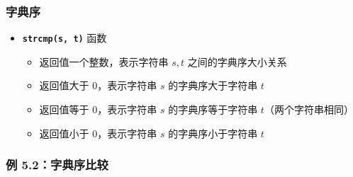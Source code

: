 \begin{frame}[fragile]
    \frametitle{字典序}

    \begin{itemize}
        \item<1-> \textbf{\lstinline|strcmp(s, t)|} 函数
        \begin{itemize}
            \item 返回值一个整数，表示字符串 $s, t$ 之间的字典序大小关系
            \item 返回值大于 $0$，表示字符串 $s$ 的字典序大于字符串 $t$
            \item 返回值等于 $0$，表示字符串 $s$ 的字典序等于字符串 $t$（两个字符串相同）
            \item 返回值小于 $0$，表示字符串 $s$ 的字典序小于字符串 $t$
        \end{itemize}
    \end{itemize}

\end{frame}

\begin{frame}[fragile]
    \frametitle{例 5.2：字典序比较}

\end{frame}

